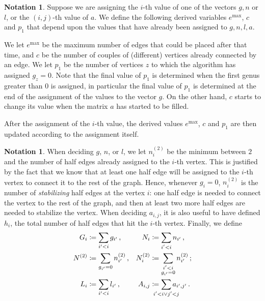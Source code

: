 \documentclass{amsart}
\theoremstyle{plain}
\theoremstyle{definition}
\newtheorem{notation}[theorem]{Notation}
\DeclareMathOperator{\MAX}{max}
\begin{document}
\begin{notation}
  Suppose we are assigning the $i$-th value of one of the vectors
  $g,n$ or $l$, or the $(i,j)$-th value of $a$. We define the following
  derived variables $e^{\MAX}$, $c$ and $p_1$ that depend upon the 
  values that have already been assigned to $g,n,l,a$.
  
  We let $e^{\MAX}$ be the maximum number of edges that could be placed 
  after that time, and $c$ be the number of couples of (different) vertices
  already connected by an edge. We let $p_1$ be the number of vertices $z$ 
  to which the algorithm has assigned $g_z = 0$. Note that the final value 
  of $p_1$ is determined when the first genus greater than $0$ is assigned, 
  in particular the final value of $p_1$ is determined at the end of the
  assignment of the values to the vector $g$. On the other hand, $c$ starts
  to change its value when the matrix $a$ has started to be filled.
  
  After the assignment of the $i$-th value, the derived values $e^{\MAX}$,
  $c$ and $p_1$ are then updated according to the assignment itself.
\end{notation}

\begin{notation} \label{partialassign}
  When deciding $g$, $n$, or $l$, we let $n^{(2)}_i$ be the minimum
  between $2$ and the number of half edges already assigned to the
  $i$-th vertex. This is justified by the fact that we know that at
  least one half edge will be assigned to the $i$-th vertex to connect
  it to the rest of the graph. Hence, whenever $g_i = 0$, $n^{(2)}_i$
  is the number of \emph{stabilizing\/} half edges at the vertex $i$:
  one half edge is needed to connect the vertex to the rest of the graph,
  and then at least two more half edges are needed to stabilize the
  vertex. When deciding $a_{i,j}$, it is also useful to have defined
  $h_i$, the total number of half edges that hit the $i$-th
  vertex. Finally, we define
  \begin{align*}
    G_i &\coloneqq \sum_{i^\prime < i} g_{i^\prime}\,\text{,} &
    N_i &\coloneqq \sum_{\substack{i^\prime < i}} n_{i^\prime}\,\text{,}\\
    N^{(2)} &\coloneqq \sum_{g_{i^\prime} = 0} n^{(2)}_{i^\prime}\,\text{,} &
    N^{(2)}_i &\coloneqq \sum_{\substack{i^\prime < i\\g_{i^\prime} = 0}} n^{(2)}_{i^\prime}\,\text{;}\\
    L_i &\coloneqq \sum_{i^\prime < i} l_{i^\prime}\,\text{,} &
    A_{i,j} &\coloneqq \sum_{\mathclap{i^\prime < i \vee j^\prime < j}} a_{i^\prime, j^\prime}\,\text{.}
  \end{align*}
\end{notation}
\end{document}
